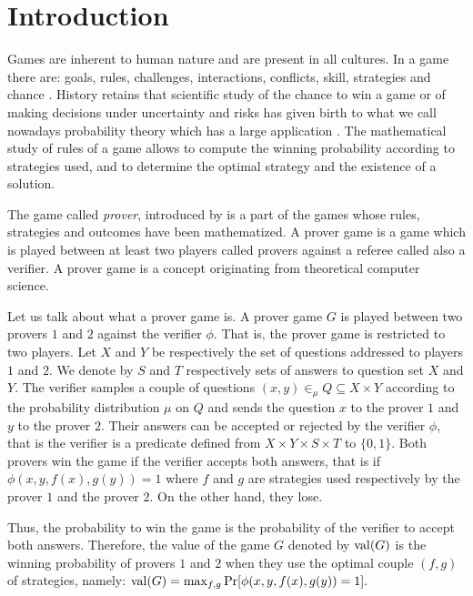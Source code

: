 \chapter{Introduction}

Games are inherent to  human nature and are present in all cultures.  In a game there are: goals, rules, challenges, interactions, conflicts, skill, strategies and chance \citep{mcgonigal2011reality, crawford1984art}. History retains that scientific study of the chance to win a game or of making decisions under uncertainty and risks has given birth to what we call nowadays probability theory which has a large application \citep{freund2012introduction}. The mathematical study of rules of a game allows to compute the winning probability according to strategies used, and to determine the optimal strategy and the existence of a solution.

The game called \emph{prover}, introduced by \cite*{ben1988multi} is a part of the games whose rules, strategies and outcomes  have been mathematized. A prover game is a game which is played between at least two players called provers against a referee called also a verifier. A prover game is a concept originating from theoretical computer science.  

Let us talk about what a prover game is. A prover game $G$ is played between two provers $1$ and $2$ against the verifier $\phi$. That is, the prover game is restricted to  two players.  Let $X$ and $Y$ be respectively the set of questions addressed to players $1$ and $2.$ We denote by $S$ and $T$ respectively  sets of answers to question set $X$ and $Y$. The verifier samples a couple of questions $(x,y) \in_{\mu} Q \subseteq X \times Y$ according to the  probability distribution $\mu$ on $Q$ and sends the question $x$ to the prover $1$ and $y$ to the prover $2.$ Their answers can be accepted or rejected by the verifier $\phi$, that is the verifier is a predicate defined from $X \times Y \times S \times T$ to $\{0,1\}.$ Both  provers win the game if the verifier accepts both answers, that is if $\phi (x,y,f(x),g(y))=1$ where $f$ and $g$ are  strategies used respectively by the prover $1$ and the prover $2.$ On the other hand, they lose.

Thus, the probability to win  the game is the probability of the verifier to accept both answers.  Therefore, the value of the game $G$ denoted by $\mathrm{val} (G)$ is the winning probability of provers $1$ and $2$ when they use the optimal couple $(f,g)$ of strategies, namely: $\mathrm{val} (G)= \max_{f,g} \mathrm{Pr}[\phi (x,y,f(x),g(y))=1].$ 

